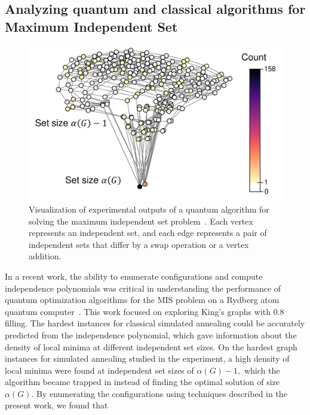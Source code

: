 \documentclass[onefignum, onetabnum]{siamart190516}
\newcommand{\<}{\langle}
\renewcommand{\>}{\rangle}
\begin{document}
\subsection{Analyzing quantum and classical algorithms for Maximum Independent Set}
\begin{figure} 
    \centering
    \includegraphics[width=.65\textwidth, trim={0cm 0cm 0cm 0cm}, clip]{figures/exp_configurations.pdf}
    \caption{Visualization of experimental outputs of a quantum algorithm for solving the maximum independent set problem~\cite{Ebadi2022}.
    Each vertex represents an independent set, and each edge represents a pair of independent sets that differ by a swap operation or a vertex addition.}
    \label{fig:exp_configuratoins}
\end{figure}
In a recent work, 
the ability to enumerate configurations and compute independence polynomials was critical in understanding the performance of quantum optimization algorithms for the MIS problem on a Rydberg atom quantum computer~\cite{Ebadi2022}. This work focused on 
exploring King's graphs with $0.8$ filling.   The hardest instances for classical simulated annealing could be accurately predicted from the independence polynomial, which gave information about the density of local minima at different independent set sizes.
On the hardest graph instances for simulated annealing studied in the experiment, a high density of local minima were found at independent set sizes of $\alpha(G)-1,$ which the algorithm became trapped in instead of finding the optimal solution of size $\alpha(G)$.
By enumerating the configurations using techniques described in the present work, we found that %
\end{document}
